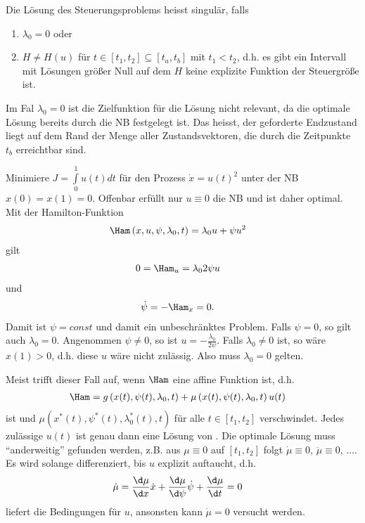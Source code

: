 \begin{defi}
Die Lösung des Steuerungsproblems heisst singulär, falls
\begin{enumerate}[label=(\Roman*)]
  \item $\lambda_0=0$ oder
  \item $H\neq H(u)$ für $t\in[t_1,t_2]\subseteq[t_a,t_b]$ mit $t_1<t_2$, d.h. es gibt ein Intervall mit Lösungen größer Null auf dem $H$ keine
  explizite Funktion der Steuergröße ist.
\end{enumerate}
\end{defi}

\begin{remark}
Im Fal $\lambda_0=0$ ist die Zielfunktion für die Lösung nicht relevant, da die optimale Lösung bereits durch die \ac{NB} festgelegt ist. Das heisst,
der geforderte Endzustand liegt auf dem Rand der Menge aller Zustandsvektoren, die durch die Zeitpunkte $t_b$ erreichtbar sind. 
\end{remark}

\begin{exmp}
Minimiere $J = \int\limits_0^1 u(t)dt$ für den Prozess $\dot{x}=u(t)^2$ unter der \ac{NB} $x(0)=x(1)=0$. Offenbar erfüllt nur $u\equiv 0$ die \ac{NB}
und ist daher optimal. Mit der Hamilton-Funktion
\begin{align*}
	\Ham\left(x,u,\psi,\lambda_0,t \right) & = \lambda_0u + \psi u^2
\end{align*}
gilt
\begin{align*}
	0 & = \Ham_u = \lambda_0 2\psi u
\end{align*}
und
\begin{align*}
	\dot{\psi}& = -\Ham_x=0.
\end{align*} 
Damit ist $\psi=const$ und damit ein unbeschränktes Problem. Falls $\psi = 0$, so gilt auch $\lambda_0=0$. Angenommen $\psi\neq 0$, so ist
$u=-\frac{\lambda_0}{2\psi}$. Falls $\lambda_0\neq 0$ ist, so wäre $x(1)>0$, d.h. diese $u$ wäre nicht zulässig. Also muss $\lambda_0=0$ gelten.
\end{exmp}

\begin{remark}
Meist trifft dieser Fall auf, wenn $\Ham$ eine affine Funktion ist, d.h. 
\begin{align*}
	\Ham & = g\left(x(t),\psi(t),\lambda_0,t \right) + \mu\left(x(t),\psi(t),\lambda_0,t \right)u(t)
\end{align*}
ist und $\mu\left(x^{\ast}(t),\psi^{\ast}(t),\lambda_0^{\ast}(t),t \right)$ für alle $t\in[t_1,t_2]$ verschwindet. Jedes zulässige $u(t)$ ist genau
dann eine Lösung von . Die optimale Lösung muss "`anderweitig"' gefunden werden, z.B. aus $\mu\equiv 0$ auf
$[t_1,t_2]$ folgt $\dot{\mu}\equiv 0$, $\ddot{\mu}\equiv 0$, $\ldots$. Es wird solange differenziert, bis $u$ explizit auftaucht, d.h. 
\begin{align*}
	\dot{\mu} & = \frac{\d \mu}{\d x}\dot{x}+\frac{\d \mu}{\d \psi}\dot{\psi}+\frac{\d\mu}{\d t} = 0
\end{align*}
liefert die Bedingungen für $u$, ansonsten kann $\dot{\mu}=0$ versucht werden.
\end{remark}

